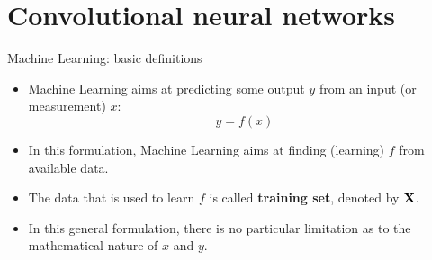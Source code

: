\documentclass[xcolor=pdftex,dvipsnames,table,mathserif]{beamer}
\begin{document}





\section{Convolutional neural networks}

\begin{frame}{Machine Learning: basic definitions}
\begin{itemize}
	\item Machine Learning aims at predicting some output $y$ from an input (or measurement) $x$:
	\begin{equation}
	y = f(x)
	\end{equation}
	\item In this formulation, Machine Learning aims at finding (learning) $f$ from available data.
	\item The data that is used to learn $f$ is called \textbf{training set}, denoted by $\mathbf{X}$.
	\item In this general formulation, there is no particular limitation as to the mathematical nature of $x$ and $y$.
\end{itemize}
\end{frame}
\end{document}

